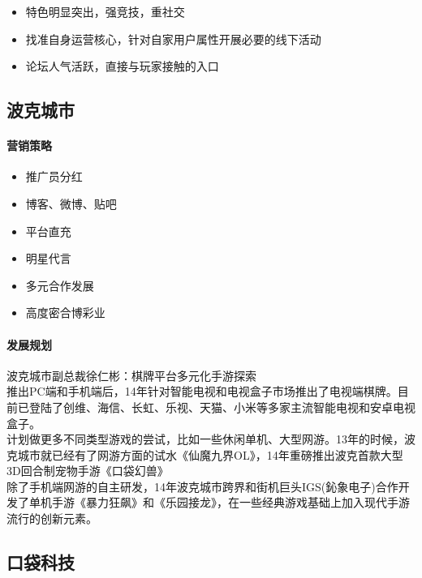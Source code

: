 \documentclass[11pt]{article}
\providecommand{\tightlist}{%
      \setlength{\itemsep}{0pt}\setlength{\parskip}{0pt}}
\begin{document}
\begin{itemize}
\tightlist
\item
  特色明显突出，强竞技，重社交
\item
  找准自身运营核心，针对自家用户属性开展必要的线下活动
\item
  论坛人气活跃，直接与玩家接触的入口
\end{itemize}

    \hypertarget{ux6ce2ux514bux57ceux5e02}{%
\subsection{波克城市}\label{ux6ce2ux514bux57ceux5e02}}

\hypertarget{ux8425ux9500ux7b56ux7565}{%
\paragraph{营销策略}\label{ux8425ux9500ux7b56ux7565}}

\begin{itemize}
\tightlist
\item
  推广员分红
\item
  博客、微博、贴吧
\item
  平台直充
\item
  明星代言
\item
  多元合作发展
\item
  高度密合博彩业
\end{itemize}

\hypertarget{ux53d1ux5c55ux89c4ux5212}{%
\paragraph{发展规划}\label{ux53d1ux5c55ux89c4ux5212}}

波克城市副总裁徐仁彬：棋牌平台多元化手游探索\\
推出PC端和手机端后，14年针对智能电视和电视盒子市场推出了电视端棋牌。目前已登陆了创维、海信、长虹、乐视、天猫、小米等多家主流智能电视和安卓电视盒子。\\
计划做更多不同类型游戏的尝试，比如一些休闲单机、大型网游。13年的时候，波克城市就已经有了网游方面的试水《仙魔九界OL》，14年重磅推出波克首款大型3D回合制宠物手游《口袋幻兽》\\
除了手机端网游的自主研发，14年波克城市跨界和街机巨头IGS(鈊象电子)合作开发了单机手游《暴力狂飙》和《乐园接龙》，在一些经典游戏基础上加入现代手游流行的创新元素。

    \hypertarget{ux53e3ux888bux79d1ux6280}{%
\subsection{口袋科技}\label{ux53e3ux888bux79d1ux6280}}
\end{document}
